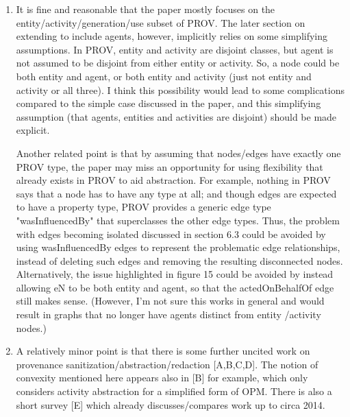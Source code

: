 \documentclass{article}
\newcommand{\showComments}{yes} %
\newcommand{\com}[2]{\ifthenelse{\equal{\showComments}{yes}}{\textcolor{#1}{#2}}{}}
\newcommand{\comment}[1]{\com{red}{#1}}
\begin{document}
\begin{enumerate}
\item It is fine and reasonable that the paper mostly focuses on the entity/activity/generation/use subset of PROV.  The later section on extending to include agents, however, implicitly relies on some simplifying assumptions.  In PROV, entity and activity are disjoint classes, but agent is not assumed to be disjoint from either entity or activity.  So, a node could be both entity and agent, or both entity and activity (just not entity and activity or all three).  I think this possibility would lead to some complications compared to the simple case discussed in the paper, and this simplifying assumption (that agents, entities and activities are disjoint) should be made explicit.

\comment{Yes, it certainly would! And we do make the implicit assumption that agents are disjoint from entities and activities. Soln: just say so somewhere. JWB to do.}
  
Another related point is that by assuming that nodes/edges have exactly one PROV type, the paper may miss an opportunity for using flexibility that already exists in PROV to aid abstraction.  For example, nothing in PROV says that a node has to have any type at all; and though edges are expected to have a property type, PROV provides a generic edge type "wasInfluencedBy" that superclasses the other edge types.  Thus, the problem with edges becoming isolated discussed in section 6.3 could be avoided by using wasInfluencedBy edges to represent the problematic edge relationships, instead of deleting such edges and removing the resulting disconnected nodes.  Alternatively, the issue highlighted in figure 15 could be avoided by instead allowing eN to be both entity and agent, so that the actedOnBehalfOf edge still makes sense.  (However, I'm not sure this works in general and would result in graphs that no longer have agents distinct from entity /activity nodes.)

\comment{Best just say this isn't a direction we go in. Just say that graphs are bi-partite. JWB to do. } 

\item A relatively minor point is that there is some further uncited work on provenance sanitization/abstraction/redaction [A,B,C,D].  The notion of convexity mentioned here appears also in [B] for example, which only considers activity abstraction for a simplified form of OPM.  There is also a short survey [E] which already discusses/compares work up to circa 2014.

\comment{Only A and B are mentioned below. Maybe we could track the others down, or ask the editor for clarification? PM to do a lit survey. } 
\end{enumerate}
\end{document}

